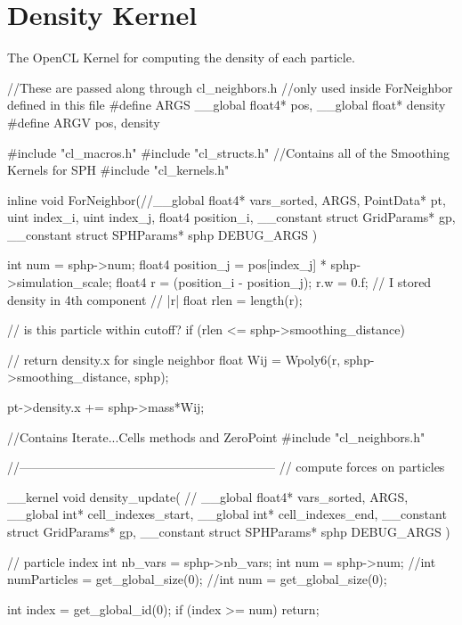 \section{Density Kernel}
The OpenCL Kernel for computing the density of each particle.

\begin{cppcode}{0}
//These are passed along through cl_neighbors.h
//only used inside ForNeighbor defined in this file
#define ARGS __global float4* pos, __global float* density
#define ARGV pos, density
        
#include "cl_macros.h"
#include "cl_structs.h"
//Contains all of the Smoothing Kernels for SPH
#include "cl_kernels.h"
        
inline void ForNeighbor(//__global float4*  vars_sorted,
                        ARGS,
                        PointData* pt,
                        uint index_i,
                        uint index_j,
                        float4 position_i,
                        __constant struct GridParams* gp,
                        __constant struct SPHParams* sphp
                        DEBUG_ARGS
                       )
{
    int num = sphp->num;
    float4 position_j = pos[index_j] * sphp->simulation_scale; 
    float4 r = (position_i - position_j);
    r.w = 0.f; // I stored density in 4th component
    // |r|
    float rlen = length(r);

    // is this particle within cutoff?
    if (rlen <= sphp->smoothing_distance)
    {
        // return density.x for single neighbor
        float Wij = Wpoly6(r, sphp->smoothing_distance, sphp);

        pt->density.x += sphp->mass*Wij;
    }
}
//Contains Iterate...Cells methods and ZeroPoint
#include "cl_neighbors.h"

//--------------------------------------------------------------
// compute forces on particles

__kernel void density_update(
//                       __global float4* vars_sorted,
                       ARGS,
                       __global int*    cell_indexes_start,
                       __global int*    cell_indexes_end,
                       __constant struct GridParams* gp,
                       __constant struct SPHParams* sphp
                       DEBUG_ARGS
                       )
{
    // particle index
    int nb_vars = sphp->nb_vars;
    int num = sphp->num;
    //int numParticles = get_global_size(0);
    //int num = get_global_size(0);

    int index = get_global_id(0);
    if (index >= num) return;

}
\end{cppcode}
